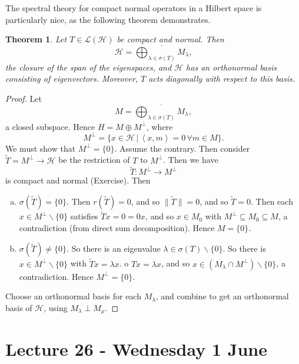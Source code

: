 \documentclass[10pt, oneside, reqno]{amsart}
\theoremstyle{plain}%
\newtheorem{thm}{Theorem}[section]
\theoremstyle{definition}
\theoremstyle{remark}
\newcommand{\given}{ \, | \,}
\newcommand{\iprod}[1]{\left\langle #1 \right\rangle}
\begin{document}
The spectral theory for compact normal operators in a Hilbert space is particularly nice, as the following theorem demonstrates.
\begin{thm}
    Let $T \in \mathcal L(\mathcal H)$ be compact and normal.  Then \[
        \mathcal H = \overline{\bigoplus_{\lambda \in \sigma(T)} M_\lambda},
    \] the closure of the span of the eigenspaces, and $\mathcal H$ has an orthonormal basis consisting of eigenvectors.  Moreover, $T$ acts diagonally with respect to this basis.   
\end{thm}
\begin{proof}
    Let \[
        M = \overline{\bigoplus_{\lambda \in \sigma(T)} M_\lambda},
    \] a closed subspace.  Hence $H = M \oplus M^\perp$, where \[
    M^\perp = \{ x \in \mathcal H \given \iprod{x, m} = 0 \, \forall m \in M \}.
    \]   We must show that $M^\perp = \{ 0 \}$.  Assume the contrary.  Then consider $\tilde T = M^\perp \rightarrow \mathcal H$ be the restriction of $T$ to $M^\perp$.  Then we have \[
        \tilde T: M^\perp \rightarrow M^\perp
    \] is compact and normal (Exercise). Then  \begin{enumerate}[(a)]
        \item $\sigma(\tilde T) = \{ 0 \}$.  Then $r(\tilde T) = 0$, and so $\| \tilde T \| = 0$, and so $\tilde T = 0$.  Then each $x \in M^\perp \backslash \{ 0 \}$ satisfies $\tilde T x = 0 = 0x$, and so $x \in M_0$ with $M^\perp \subseteq M_0 \subseteq M$, a contradiction (from direct sum decomposition).  Hence $M = \{ 0 \}$.  
        \item $\sigma(\tilde T) \neq \{ 0 \}$.  So there is an eigenvalue $\lambda \in \sigma(T) \backslash \{ 0 \}$.  So there is $x \in M^\perp \backslash \{ 0 \}$ with $\tilde T x = \lambda x$.  o $Tx = \lambda x$, and so $x \in (M_\lambda \cap M^\perp) \backslash \{ 0 \}$, a contradiction.  Hence $M^\perp = \{ 0 \}$.    
    \end{enumerate}
    
    Choose an orthonormal basis for each $M_\lambda$, and combine to get an orthonormal basis of $\mathcal H$, using $M_\lambda \perp M_\mu$.  
\end{proof}  




\section{Lecture 26 - Wednesday 1 June} %
\label{sec:lecture_26_wednesday_1_june}
\end{document}
